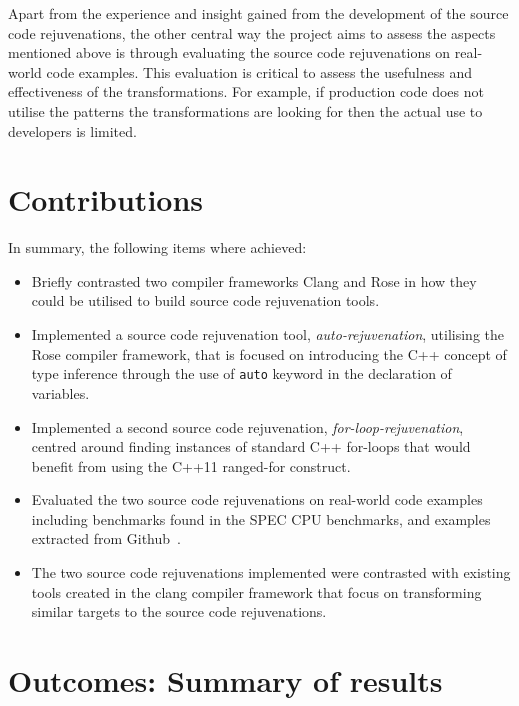 \documentclass[bsc,frontabs,singlespacing,twoside,parskip,deptreport]{infthesis}
\begin{document}
Apart from the experience and insight gained from the development of the source code rejuvenations, the other central way the project aims to assess the aspects mentioned above is through evaluating the source code rejuvenations on real-world code examples. This evaluation is critical to assess the usefulness and effectiveness of the transformations. For example, if production code does not utilise the patterns the transformations are looking for then the actual use to developers is limited.


    
\section{Contributions}
In summary, the following items where achieved:
\begin{itemize}
    \item Briefly contrasted two compiler frameworks Clang and Rose in how they could be utilised to build source code rejuvenation tools.
    \item Implemented a source code rejuvenation tool, \textit{auto-rejuvenation}, utilising the Rose compiler framework, that is focused on introducing the C++ concept of type inference through the use of \texttt{auto} keyword in the declaration of variables.
    \item Implemented a second source code rejuvenation, \textit{for-loop-rejuvenation}, centred around finding instances of standard  C++ for-loops that would benefit from using the C++11 ranged-for construct. 
    \item Evaluated the two source code rejuvenations on real-world code examples including benchmarks found in the SPEC CPU benchmarks, and examples extracted from Github~\cite{GITHUB}. 
    \item The two source code rejuvenations implemented were contrasted with existing tools created in the clang compiler framework that focus on transforming similar targets to the source code rejuvenations.  
\end{itemize}

\section{Outcomes: Summary of results}
\end{document}
